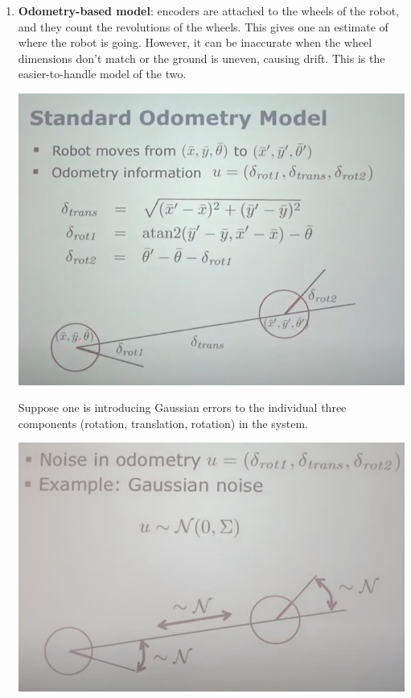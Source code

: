 \documentclass[a4paper]{article}
\begin{document}
\begin{enumerate}

    \item \textbf{Odometry-based model}: encoders are attached to the wheels of the robot, and they count the revolutions of the wheels. This gives one an estimate of where the robot is going. However, it can be inaccurate when the wheel dimensions don't match or the ground is uneven, causing drift. This is the easier-to-handle model of the two.
    
    \begin{center}
    \includegraphics[scale=0.5]{stdod}
    \end{center}
    
    Suppose one is introducing Gaussian errors to the individual three components (rotation, translation, rotation) in the system.
    
    \begin{center}
    \includegraphics[scale=0.5]{odgaus}
    \end{center}
    

\end{enumerate}
\end{document}
